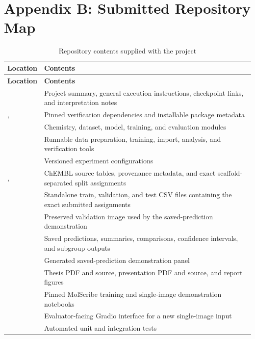 \documentclass[11pt,a4paper]{article}
\begin{document}
\section*{Appendix B: Submitted Repository Map}

\begin{longtable}{L{5cm}L{9.2cm}}
\caption{Repository contents supplied with the project}\label{tab:repository}\\
\toprule
\textbf{Location} & \textbf{Contents} \\
\midrule
\endfirsthead
\toprule
\textbf{Location} & \textbf{Contents} \\
\midrule
\endhead
{} & Project summary, general execution instructions, checkpoint links, and interpretation notes \\
,  & Pinned verification dependencies and installable package metadata \\
 & Chemistry, dataset, model, training, and evaluation modules \\
 & Runnable data preparation, training, import, analysis, and verification tools \\
 & Versioned experiment configurations \\
,  & ChEMBL source tables, provenance metadata, and exact scaffold-separated split assignments \\
 & Standalone train, validation, and test CSV files containing the exact submitted assignments \\
 & Preserved validation image used by the saved-prediction demonstration \\
 & Saved predictions, summaries, comparisons, confidence intervals, and subgroup outputs \\
 & Generated saved-prediction demonstration panel \\
 & Thesis PDF and source, presentation PDF and source, and report figures \\
 & Pinned MolScribe training and single-image demonstration notebooks \\
 & Evaluator-facing Gradio interface for a new single-image input \\
 & Automated unit and integration tests \\
\bottomrule
\end{longtable}
\end{document}
